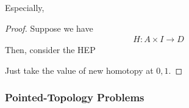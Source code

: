 \documentclass[Total.tex]{subfiles}
\begin{document}
				\begin{corollary}
					Especially,
					\begin{center}
					\end{center}
				\end{corollary}
				\begin{proof}
					Suppose we have
					\begin{gather*}
						H:A\times I\rightarrow D
					\end{gather*}
					Then, consider the HEP
					\begin{center}
					\end{center}
					
					Just take the value of new homotopy at $0,1$.
				\end{proof}
				
				\subsubsection{Pointed-Topology Problems}
				
\end{document}
